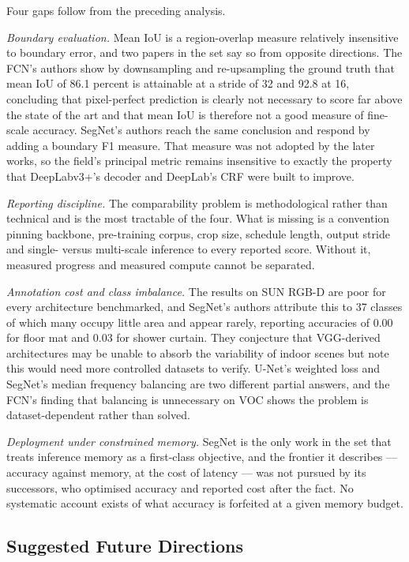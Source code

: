 \documentclass[journal]{IEEEtran}
\begin{document}
Four gaps follow from the preceding analysis.

\emph{Boundary evaluation.} Mean IoU is a region-overlap measure relatively
insensitive to boundary error, and two papers in the set say so from opposite
directions. The FCN's authors show by downsampling and re-upsampling the ground truth
that mean IoU of 86.1 percent is attainable at a stride of 32 and 92.8 at 16,
concluding that pixel-perfect prediction is clearly not necessary to score far above
the state of the art and that mean IoU is therefore not a good measure of fine-scale
accuracy. SegNet's authors reach the same conclusion and respond by adding a boundary
F1 measure. That measure was not adopted by the later works, so the field's principal
metric remains insensitive to exactly the property that DeepLabv3+'s decoder and
DeepLab's CRF were built to improve.

\emph{Reporting discipline.} The comparability problem is methodological rather than
technical and is the most tractable of the four. What is missing is a convention
pinning backbone, pre-training corpus, crop size, schedule length, output stride and
single- versus multi-scale inference to every reported score. Without it, measured
progress and measured compute cannot be separated.

\emph{Annotation cost and class imbalance.} The results on SUN RGB-D are poor for every
architecture benchmarked, and SegNet's authors attribute this to 37 classes of which
many occupy little area and appear rarely, reporting accuracies of 0.00 for floor mat
and 0.03 for shower curtain. They conjecture that VGG-derived architectures may be
unable to absorb the variability of indoor scenes but note this would need more
controlled datasets to verify. U-Net's weighted loss and SegNet's median frequency
balancing are two different partial answers, and the FCN's finding that balancing is
unnecessary on VOC shows the problem is dataset-dependent rather than solved.

\emph{Deployment under constrained memory.} SegNet is the only work in the set that
treats inference memory as a first-class objective, and the frontier it describes ---
accuracy against memory, at the cost of latency --- was not pursued by its successors,
who optimised accuracy and reported cost after the fact. No systematic account exists
of what accuracy is forfeited at a given memory budget.

\subsection{Suggested Future Directions}
\end{document}
